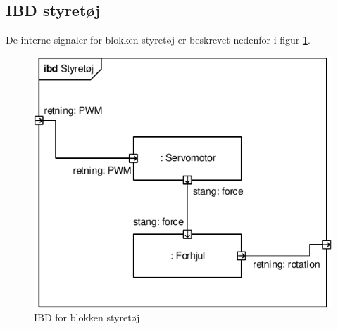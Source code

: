
\subsection{IBD styretøj}

De interne signaler for blokken styretøj er beskrevet nedenfor i figur \ref{fig:ibd_styretoej}.

\begin{figure}[h]
\centering
\includegraphics[scale=1]{../fig/diagrammer/bil/ibd_styretoej.pdf}
\caption{IBD for blokken styretøj}
\label{fig:ibd_styretoej}
\end{figure}